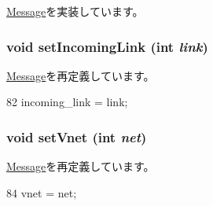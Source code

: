 \hyperlink{classMessage_a3ea5f7af5db62cc24f4e40df9ea5c971}{Message}を実装しています。\hypertarget{classNetworkMessage_a61dc2149684cb0f99ce3117c2c4c2e5a}{
\subsubsection[{setIncomingLink}]{\setlength{\rightskip}{0pt plus 5cm}void setIncomingLink (int {\em link})}}
\label{classNetworkMessage_a61dc2149684cb0f99ce3117c2c4c2e5a}


\hyperlink{classMessage_a744ab1b6f6e038529292528e92ecf5dc}{Message}を再定義しています。


\begin{DoxyCode}
82 { incoming_link = link; }
\end{DoxyCode}
\hypertarget{classNetworkMessage_a528d693acf172c3acd1f7fbf73a463f9}{
\subsubsection[{setVnet}]{\setlength{\rightskip}{0pt plus 5cm}void setVnet (int {\em net})}}
\label{classNetworkMessage_a528d693acf172c3acd1f7fbf73a463f9}


\hyperlink{classMessage_a95f04a7c3408d2acb1390edf886071c9}{Message}を再定義しています。


\begin{DoxyCode}
84 { vnet = net; }
\end{DoxyCode}


